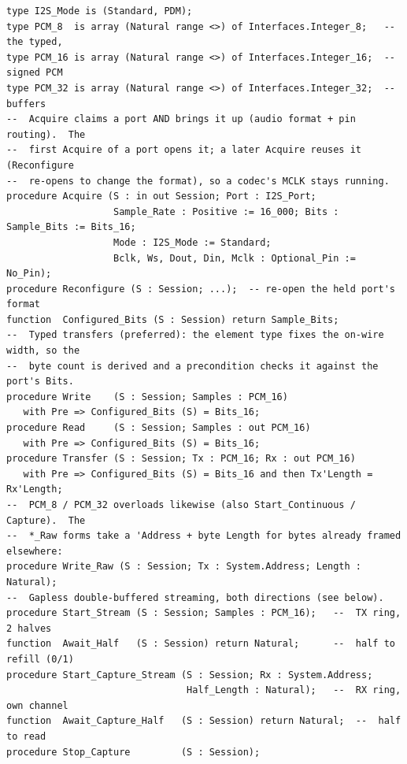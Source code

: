 \begin{lstlisting}
type I2S_Mode is (Standard, PDM);
type PCM_8  is array (Natural range <>) of Interfaces.Integer_8;   -- the typed,
type PCM_16 is array (Natural range <>) of Interfaces.Integer_16;  --  signed PCM
type PCM_32 is array (Natural range <>) of Interfaces.Integer_32;  --  buffers
--  Acquire claims a port AND brings it up (audio format + pin routing).  The
--  first Acquire of a port opens it; a later Acquire reuses it (Reconfigure
--  re-opens to change the format), so a codec's MCLK stays running.
procedure Acquire (S : in out Session; Port : I2S_Port;
                   Sample_Rate : Positive := 16_000; Bits : Sample_Bits := Bits_16;
                   Mode : I2S_Mode := Standard;
                   Bclk, Ws, Dout, Din, Mclk : Optional_Pin := No_Pin);
procedure Reconfigure (S : Session; ...);  -- re-open the held port's format
function  Configured_Bits (S : Session) return Sample_Bits;
--  Typed transfers (preferred): the element type fixes the on-wire width, so the
--  byte count is derived and a precondition checks it against the port's Bits.
procedure Write    (S : Session; Samples : PCM_16)
   with Pre => Configured_Bits (S) = Bits_16;
procedure Read     (S : Session; Samples : out PCM_16)
   with Pre => Configured_Bits (S) = Bits_16;
procedure Transfer (S : Session; Tx : PCM_16; Rx : out PCM_16)
   with Pre => Configured_Bits (S) = Bits_16 and then Tx'Length = Rx'Length;
--  PCM_8 / PCM_32 overloads likewise (also Start_Continuous / Capture).  The
--  *_Raw forms take a 'Address + byte Length for bytes already framed elsewhere:
procedure Write_Raw (S : Session; Tx : System.Address; Length : Natural);
--  Gapless double-buffered streaming, both directions (see below).
procedure Start_Stream (S : Session; Samples : PCM_16);   --  TX ring, 2 halves
function  Await_Half   (S : Session) return Natural;      --  half to refill (0/1)
procedure Start_Capture_Stream (S : Session; Rx : System.Address;
                                Half_Length : Natural);   --  RX ring, own channel
function  Await_Capture_Half   (S : Session) return Natural;  --  half to read
procedure Stop_Capture         (S : Session);
\end{lstlisting}


